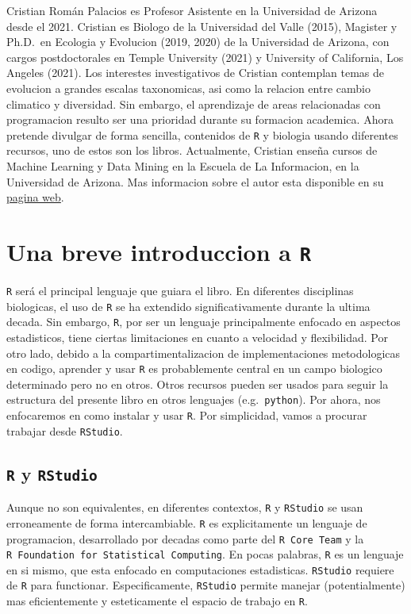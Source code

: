 \documentclass[
]{book}
\begin{document}
Cristian Román Palacios es Profesor Asistente en la Universidad de Arizona desde el 2021. Cristian es Biologo de la Universidad del Valle (2015), Magister y Ph.D.~en Ecologia y Evolucion (2019, 2020) de la Universidad de Arizona, con cargos postdoctorales en Temple University (2021) y University of California, Los Angeles (2021). Los interestes investigativos de Cristian contemplan temas de evolucion a grandes escalas taxonomicas, asi como la relacion entre cambio climatico y diversidad. Sin embargo, el aprendizaje de areas relacionadas con programacion resulto ser una prioridad durante su formacion academica. Ahora pretende divulgar de forma sencilla, contenidos de \texttt{R} y biologia usando diferentes recursos, uno de estos son los libros. Actualmente, Cristian enseña cursos de Machine Learning y Data Mining en la Escuela de La Informacion, en la Universidad de Arizona. Mas informacion sobre el autor esta disponible en su \href{https://cromanpa94.github.io/cromanpa/}{pagina web}.

\hypertarget{una-breve-introduccion-a-r}{%
\chapter{\texorpdfstring{Una breve introduccion a \texttt{R}}{Una breve introduccion a R}}\label{una-breve-introduccion-a-r}}

\texttt{R} será el principal lenguaje que guiara el libro. En diferentes disciplinas biologicas, el uso de \texttt{R} se ha extendido significativamente durante la ultima decada. Sin embargo, \texttt{R}, por ser un lenguaje principalmente enfocado en aspectos estadisticos, tiene ciertas limitaciones en cuanto a velocidad y flexibilidad. Por otro lado, debido a la compartimentalizacion de implementaciones metodologicas en codigo, aprender y usar \texttt{R} es probablemente central en un campo biologico determinado pero no en otros. Otros recursos pueden ser usados para seguir la estructura del presente libro en otros lenguajes (e.g.~\texttt{python}). Por ahora, nos enfocaremos en como instalar y usar \texttt{R}. Por simplicidad, vamos a procurar trabajar desde \texttt{RStudio}.

\hypertarget{r-y-rstudio}{%
\section{\texorpdfstring{\texttt{R} y \texttt{RStudio}}{R y RStudio}}\label{r-y-rstudio}}

Aunque no son equivalentes, en diferentes contextos, \texttt{R} y \texttt{RStudio} se usan erroneamente de forma intercambiable. \texttt{R} es explicitamente un lenguaje de programacion, desarrollado por decadas como parte del \texttt{R\ Core\ Team} y la \texttt{R\ Foundation\ for\ Statistical\ Computing}. En pocas palabras, \texttt{R} es un lenguaje en si mismo, que esta enfocado en computaciones estadisticas. \texttt{RStudio} requiere de \texttt{R} para functionar. Especificamente, \texttt{RStudio} permite manejar (potentialmente) mas eficientemente y esteticamente el espacio de trabajo en \texttt{R}.
\end{document}
